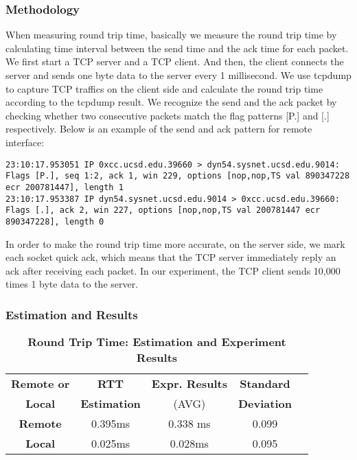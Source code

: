\subsubsection{Methodology}

When measuring round trip time, basically we measure the round trip time by calculating time interval between the send time and the ack time for each packet. We first start a TCP server and a TCP client. And then, the client connects the server and sends one byte data to the server every 1 millisecond. We use tcpdump to capture TCP traffics on the client side and calculate the round trip time according to the tcpdump result.  We recognize the send and the ack packet by checking whether two consecutive packets match the flag patterns [P.] and [.] respectively. Below is an example of the send and ack pattern for remote interface:

\begin{lstlisting}
23:10:17.953051 IP 0xcc.ucsd.edu.39660 > dyn54.sysnet.ucsd.edu.9014: Flags [P.], seq 1:2, ack 1, win 229, options [nop,nop,TS val 890347228 ecr 200781447], length 1
23:10:17.953387 IP dyn54.sysnet.ucsd.edu.9014 > 0xcc.ucsd.edu.39660: Flags [.], ack 2, win 227, options [nop,nop,TS val 200781447 ecr 890347228], length 0
\end{lstlisting}

In order to make the round trip time more accurate, on the server side, we mark each socket quick ack, which means that the TCP server immediately reply an ack after receiving each packet. In our experiment, the TCP client sends 10,000 times 1 byte data to the server.

\subsubsection{Estimation and Results}

\begin{table}[ht]
  \centering
  \caption{\textbf{Round Trip Time: Estimation and Experiment Results}}
  \begin{threeparttable}
  \begin{tabular}{ccccc}
  \hline
      \textbf{Remote or} & \textbf{RTT}   & \textbf{Expr. Results} & \textbf{Standard}\\
      \textbf{Local}   &  \textbf{Estimation}  & (AVG)   & \textbf{Deviation} \\
  \hline
      \textbf{Remote}  & 0.395ms & 0.338 ms & 0.099 \\
      \textbf{Local} & 0.025ms & 0.028ms & 0.095 \\
  \hline
  \end{tabular}
  \end{threeparttable}
  \label{round_trip_time_table}
\end{table}

